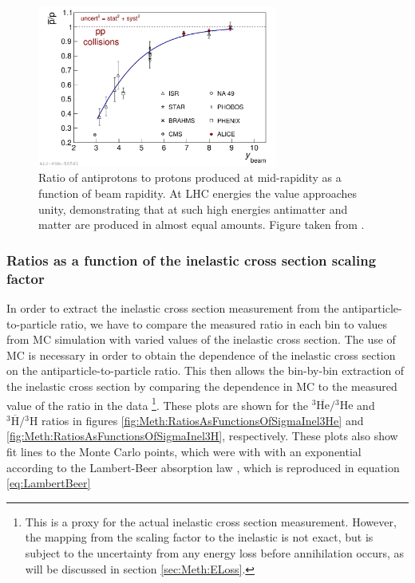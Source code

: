 \begin{figure}
    \centering
    \includegraphics[width=0.7\textwidth]{figures/primordial_ratio.pdf}
    \caption{Ratio of antiprotons to protons produced at mid-rapidity as a function of beam rapidity. At LHC energies the value approaches unity, demonstrating that at such high energies antimatter and matter are produced in almost equal amounts. Figure taken from \cite{Abbas_2013_primordial_ratio}.}
    \label{fig:BaryochemicalPotential}
\end{figure}



\subsubsection{Ratios as a function of the inelastic cross section scaling factor}
In order to extract the inelastic cross section measurement from the antiparticle-to-particle ratio, we have to compare the measured ratio in each bin to values from MC simulation with varied values of the inelastic cross section. The use of MC is necessary in order to obtain the dependence of the inelastic cross section on the antiparticle-to-particle ratio. This then allows the bin-by-bin extraction of the inelastic cross section by comparing the dependence in MC to the measured value of the ratio in the data \footnote{This is a proxy for the actual inelastic cross section measurement. However, the mapping from the scaling factor to the inelastic is not exact, but is subject to the uncertainty from any energy loss before annihilation occurs, as will be discussed in section \ref{sec:Meth:ELoss}.}. These plots are shown for the $^3\overline{\mathrm{He}}/{^3\mathrm{He}}$ and $^3\overline{\mathrm{H}}/{^3\mathrm{H}}$ ratios in figures \ref{fig:Meth:RatiosAsFunctionsOfSigmaInel3He} and \ref{fig:Meth:RatiosAsFunctionsOfSigmaInel3H}, respectively. These plots also show fit lines to the Monte Carlo points, which were with with an exponential according to the Lambert-Beer absorption law \cite{Lambert-Beer}, which is reproduced in equation \ref{eq:LambertBeer}

